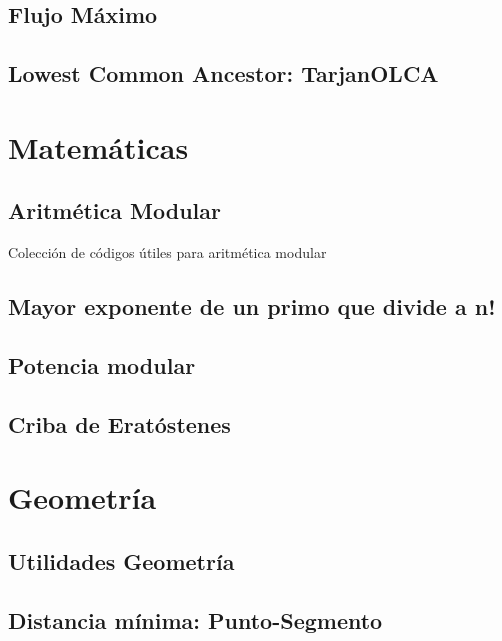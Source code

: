 \documentclass[10pt,letterpaper,twocolumn,twosided]{article}
\newcommand{\codigofuente}[1]{

\dotfill
}
\begin{document}
\subsection{Flujo Máximo}

\subsection{Lowest Common Ancestor: TarjanOLCA}

\section{Matemáticas}

\subsection{Aritmética Modular}

Colección de códigos útiles para aritmética modular\\
\codigofuente{../src/euclidean.${EXT}}

\subsection{Mayor exponente de un primo que divide a n!}
\codigofuente{../src/pow_div.${EXT}}


\subsection{Potencia modular}

\subsection{Criba de Eratóstenes}



\section{Geometría}

\subsection{Utilidades Geometría}

\subsection{Distancia mínima: Punto-Segmento}
\end{document}
